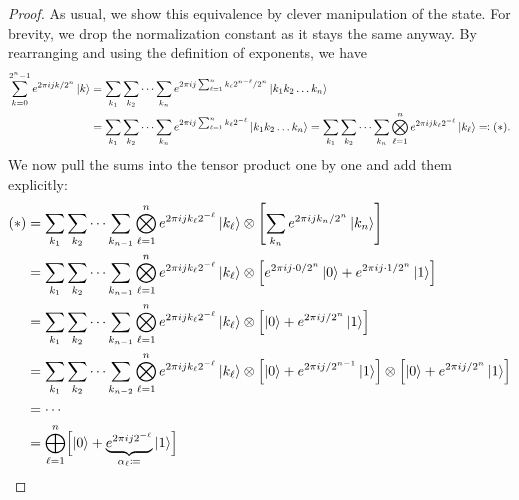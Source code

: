 			\begin{proof}
				As usual, we show this equivalence by clever manipulation of the state. For brevity, we drop the normalization constant as it stays the same anyway. By rearranging and using the definition of exponents, we have
				\begin{align}
					\sum_{k = 0}^{2^n - 1} e^{2 \pi i j k / 2^n} \ket{k}
					 & = \sum_{k_1} \sum_{k_2} \dots \sum_{k_n} e^{2 \pi i j \sum_{\ell = 1}^{n} k_\ell 2^{n - \ell} / 2^n} \ket{k_1 k_2 \dots k_n} \\
					 & = \sum_{k_1} \sum_{k_2} \dots \sum_{k_n} e^{2 \pi i j \sum_{\ell = 1}^{n} k_\ell 2^{-\ell}} \ket{k_1 k_2 \dots k_n}
					= \sum_{k_1} \sum_{k_2} \dots \sum_{k_n} \bigotimes_{\ell = 1}^{n} e^{2 \pi i j k_\ell 2^{-\ell}} \ket{k_\ell} \eqqcolon (\ast).
				\end{align}
				We now pull the sums into the tensor product one by one and add them explicitly:
				\begin{align}
					(\ast)
					 & = \sum_{k_1} \sum_{k_2} \dots \sum_{k_{n - 1}} \bigotimes_{\ell = 1}^{n} e^{2 \pi i j k_\ell 2^{-\ell}} \ket{k_\ell} \otimes \Biggl[ \sum_{k_n} e^{2 \pi i j k_n / 2^n} \ket{k_n} \Biggr]                                                          \\
					 & = \sum_{k_1} \sum_{k_2} \dots \sum_{k_{n - 1}} \bigotimes_{\ell = 1}^{n} e^{2 \pi i j k_\ell 2^{-\ell}} \ket{k_\ell} \otimes \Bigl[ e^{2 \pi i j \cdot 0 / 2^n} \ket{0} + e^{2 \pi i j \cdot 1 / 2^n} \ket{1} \Bigr]                               \\
					 & = \sum_{k_1} \sum_{k_2} \dots \sum_{k_{n - 1}} \bigotimes_{\ell = 1}^{n} e^{2 \pi i j k_\ell 2^{-\ell}} \ket{k_\ell} \otimes \Bigl[ \ket{0} + e^{2 \pi i j / 2^n} \ket{1} \Bigr]                                                                   \\
					 & = \sum_{k_1} \sum_{k_2} \dots \sum_{k_{n - 2}} \bigotimes_{\ell = 1}^{n} e^{2 \pi i j k_\ell 2^{-\ell}} \ket{k_\ell} \otimes \Bigl[ \ket{0} + e^{2 \pi i j / 2^{n - 1}} \ket{1} \Bigr] \otimes \Bigl[ \ket{0} + e^{2 \pi i j / 2^n} \ket{1} \Bigr] \\
					 & = \cdots                                                                                                                                                                                                                                           \\
					 & = \bigoplus_{\ell = 1}^{n} \Bigl[ \ket{0} + \underbrace{e^{2 \pi i j 2^{-\ell}}}_{\alpha_\ell \coloneqq} \ket{1} \Bigr]

\end{align}
\end{proof}
